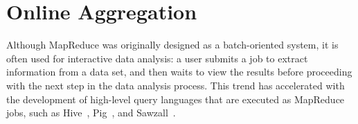 



\section{Online Aggregation}
\label{ch:hop:sec:online}

Although MapReduce was originally designed as a batch-oriented system,
it is often used for interactive data analysis: a user submits a job
to extract information from a data set, and then waits to view the
results before proceeding with the next step in the data analysis
process. This trend has accelerated with the development of high-level
query languages that are executed as MapReduce jobs, such as
Hive~\cite{hive}, Pig~\cite{pig}, and Sawzall~\cite{sawzall}.

